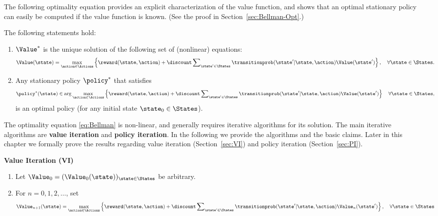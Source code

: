 The following optimality equation provides an explicit
characterization of the value function, and shows that an optimal
stationary policy can easily be computed if the value function is
known. (See the proof in Section~\ref{sec:Bellman-Opt}.)

\begin{theorem}\label{thm:inf_Bellman} The following statements hold:
\begin{enumerate}
  \item $\Value_{}^*$ is the unique solution of the following set of (nonlinear) equations:
\begin{equation}\label{eq:Bellman}
\Value(\state) = \mathop {\max }\limits_{\action \in \Actions}
\left\{ {\reward(\state,\action) + \discount \sum\nolimits_{\state'
\in \States} {\transitionprob(\state'|\state,\action)\Value(\state')} } \right\},
\quad \forall \state \in \States.
\end{equation}
  \item Any stationary policy ${\policy ^*}$ that satisfies
\[{\policy ^*}(\state) \in \arg {\max _{\action \in \Actions}}\left\{ {\reward(\state,\action) + \discount \sum\nolimits_{\state' \in \States} {\transitionprob(\state'|\state,\action)\Value(\state')} } \right\} \quad \forall \state \in \States, \]
     is an optimal policy (for any initial state ${\state_0} \in \States$).
\end{enumerate}
\end{theorem}
The optimality equation \eqref{eq:Bellman} is non-linear, and
generally requires iterative algorithms for its solution. The main
iterative algorithms are \textbf{value iteration} and \textbf{policy
iteration}. In the following we provide the algorithms and the basic
claims. Later in this chapter we formally prove the results
regarding value iteration (Section~\ref{sec:VI}) and policy
iteration (Section~\ref{sec:PI}).


\begin{algorithm_}\textbf{Value Iteration (VI)}\label{alg:VI}
\begin{enumerate}
  \item Let ${\Value_0} = {({\Value_0}(\state))_{\state \in \States}}$ be arbitrary.
  \item For $n = 0,1,2, \ldots $, set
\[{\Value_{n + 1}}(\state) = \mathop {\max }\limits_{\action \in \Actions} \left\{ {\reward(\state,\action) + \discount \sum\nolimits_{\state' \in \States} {\transitionprob(\state'|\state,\action){\Value_n}(\state')} } \right\},    \quad \forall \state \in \States\]
\end{enumerate}
\end{algorithm_}

